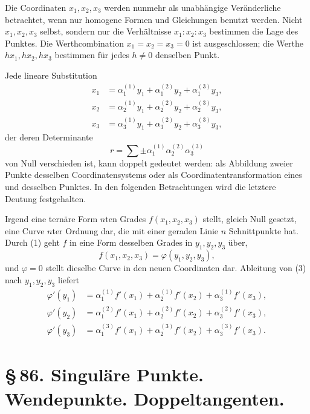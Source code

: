 \documentclass[11pt]{article}
\begin{document}
Die Coordinaten $x_1,x_2,x_3$ werden nunmehr als unabhängige Veränderliche betrachtet, wenn nur homogene Formen und Gleichungen benutzt werden. Nicht $x_1,x_2,x_3$ selbst, sondern nur die Verhältnisse $x_1:x_2:x_3$ bestimmen die Lage des Punktes. Die Werthcombination $x_1=x_2=x_3=0$ ist ausgeschlossen; die Werthe $hx_1,hx_2,hx_3$ bestimmen für jedes $h\ne0$ denselben Punkt.

Jede lineare Substitution
\begin{equation}
\begin{aligned}
 x_1&=\alpha^{(1)}_1y_1+\alpha^{(2)}_1y_2+\alpha^{(3)}_1y_3,\\
 x_2&=\alpha^{(1)}_2y_1+\alpha^{(2)}_2y_2+\alpha^{(3)}_2y_3,\\
 x_3&=\alpha^{(1)}_3y_1+\alpha^{(2)}_3y_2+\alpha^{(3)}_3y_3,
\end{aligned}
\tag{1}
\end{equation}
der deren Determinante
\begin{equation}
 r=\sum \pm \alpha^{(1)}_1\alpha^{(2)}_2\alpha^{(3)}_3
 \tag{2}
\end{equation}
von Null verschieden ist, kann doppelt gedeutet werden: als Abbildung zweier Punkte desselben Coordinatensystems oder als Coordinatentransformation eines und desselben Punktes. In den folgenden Betrachtungen wird die letztere Deutung festgehalten.

Irgend eine ternäre Form $n$ten Grades $f(x_1,x_2,x_3)$ stellt, gleich Null gesetzt, eine Curve $n$ter Ordnung dar, die mit einer geraden Linie $n$ Schnittpunkte hat. Durch (1) geht $f$ in eine Form desselben Grades in $y_1,y_2,y_3$ über,
\begin{equation}
 f(x_1,x_2,x_3)=\varphi(y_1,y_2,y_3),
 \tag{3}
\end{equation}
und $\varphi=0$ stellt dieselbe Curve in den neuen Coordinaten dar. Ableitung von (3) nach $y_1,y_2,y_3$ liefert
\begin{equation}
\begin{aligned}
 \varphi'(y_1)&=\alpha^{(1)}_1 f'(x_1)+\alpha^{(1)}_2 f'(x_2)+\alpha^{(1)}_3 f'(x_3),\\
 \varphi'(y_2)&=\alpha^{(2)}_1 f'(x_1)+\alpha^{(2)}_2 f'(x_2)+\alpha^{(2)}_3 f'(x_3),\\
 \varphi'(y_3)&=\alpha^{(3)}_1 f'(x_1)+\alpha^{(3)}_2 f'(x_2)+\alpha^{(3)}_3 f'(x_3).
\end{aligned}
\tag{4}
\end{equation}

\section*{\S\,86. Singuläre Punkte. Wendepunkte. Doppeltangenten.}
\end{document}
